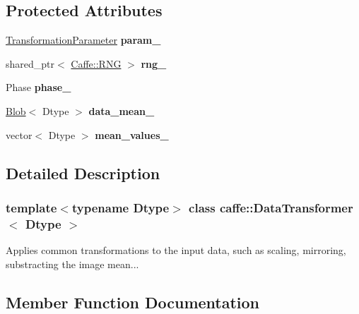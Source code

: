 \subsection*{Protected Attributes}
\begin{DoxyCompactItemize}
\item 
\mbox{\label{classcaffe_1_1_data_transformer_a7d0dd7f13701a450c37c989a39ac50e0}} 
\mbox{\hyperlink{classcaffe_1_1_transformation_parameter}{Transformation\+Parameter}} {\bfseries param\+\_\+}
\item 
\mbox{\label{classcaffe_1_1_data_transformer_af2c3fb206d9f25350f054ccc3177d5f9}} 
shared\+\_\+ptr$<$ \mbox{\hyperlink{classcaffe_1_1_caffe_1_1_r_n_g}{Caffe\+::\+R\+NG}} $>$ {\bfseries rng\+\_\+}
\item 
\mbox{\label{classcaffe_1_1_data_transformer_a30cf039d7452683f4f91e022fd8eec32}} 
Phase {\bfseries phase\+\_\+}
\item 
\mbox{\label{classcaffe_1_1_data_transformer_acd7eb80f5b66e94d75b52e35d63039a4}} 
\mbox{\hyperlink{classcaffe_1_1_blob}{Blob}}$<$ Dtype $>$ {\bfseries data\+\_\+mean\+\_\+}
\item 
\mbox{\label{classcaffe_1_1_data_transformer_acbfe65703af06314cc96746167f7feb5}} 
vector$<$ Dtype $>$ {\bfseries mean\+\_\+values\+\_\+}
\end{DoxyCompactItemize}


\subsection{Detailed Description}
\subsubsection*{template$<$typename Dtype$>$\newline
class caffe\+::\+Data\+Transformer$<$ Dtype $>$}

Applies common transformations to the input data, such as scaling, mirroring, substracting the image mean... 

\subsection{Member Function Documentation}
\mbox{\label{classcaffe_1_1_data_transformer_a1e43b0fb80cded5bb854e1a06004bebf}} 
